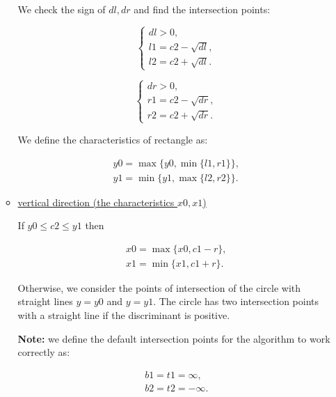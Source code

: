 \documentclass{report}
\begin{document}
\begin{itemize}
\begin{itemize}
			We check the sign of $dl, dr$ and find the intersection points:
			
			\begin{equation}
				\begin{cases}
			     	dl > 0,\\ 
					l1 = c2 - \sqrt {dl},\\
					l2 = c2 + \sqrt {dl}.
					\label{eq:l1l2}
				\end{cases}
		 	\end{equation}
	 	
			\begin{equation}
				\begin{cases}
					dr > 0,\\ 
					r1 = c2 - \sqrt {dr},\\
					r2 = c2 + \sqrt {dr}.
					\label{eq:r1r2}
				\end{cases}
			\end{equation}
			
			We define the characteristics of rectangle as:
			
			\begin{equation}
				\begin{gathered}
					y0 = \max\{y0, \min\{l1, r1\}\},\\
					y1 = \min\{y1, \max\{l2, r2\}\}.
				\end{gathered}
			\end{equation}
				
			\item \underline {vertical direction (the characteristics $x0, x1$) }
			
			If   $y0 \le c2 \le y1$ then
			
			\begin{equation}
				\begin{gathered}
					x0 = \max\{x0, c1-r\},\\
					x1 = \min\{x1, c1+r\}.
				\end{gathered}
		\end{equation}
	
			Otherwise, we consider the points of intersection of the circle with straight lines $y = y0$ and $y = y1$. The circle has two intersection points with a straight line if the discriminant is positive.
			
			{\bfseries Note:} we define the default intersection points for the algorithm to work correctly as:
			
			\begin{equation}
				\begin{gathered}
					b1 = t1 =  \infty,\\
					b2 = t2 = -\infty.
					\label{eq:btinf}
			\end{gathered}
		\end{equation}
		

\end{itemize}
\end{itemize}
\end{document}
